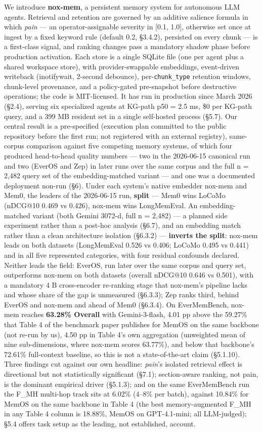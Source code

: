 \documentclass[
]{article}
\begin{document}
We introduce \textbf{nox-mem}, a persistent memory system for autonomous
LLM agents. Retrieval and retention are governed by an additive salience
formula in which \emph{pain} --- an operator-assignable severity in
{[}0.1, 1.0{]}, otherwise set once at ingest by a fixed keyword rule
(default 0.2, §3.4.2), persisted on every chunk --- is a first-class
signal, and ranking changes pass a mandatory shadow phase before
production activation. Each store is a single SQLite file (one per agent
plus a shared workspace store), with provider-swappable embeddings,
event-driven writeback (inotifywait, 2-second debounce),
per-\texttt{chunk\_type} retention windows, chunk-level provenance, and
a policy-gated pre-snapshot before destructive operations; the code is
MIT-licensed. It has run in production since March 2026 (§2.4), serving
six specialized agents at KG-path p50 = 2.5 ms, \$0 per KG-path query,
and a 399 MB resident set in a single self-hosted process (§5.7). Our
central result is a pre-specified (execution plan committed to the
public repository before the first run; not registered with an external
registry), same-corpus comparison against five competing memory systems,
of which four produced head-to-head quality numbers --- two in the
2026-06-15 canonical run and two (EverOS and Zep) in later runs over the
same corpus and the full n = 2,482 query set of the embedding-matched
variant --- and one was a documented deployment non-run (§6). Under each
system's native embedder nox-mem and Mem0, the leaders of the 2026-06-15
run, \textbf{split} --- Mem0 wins LoCoMo (nDCG@10 0.469 vs 0.426),
nox-mem wins LongMemEval. An embedding-matched variant (both Gemini
3072-d, full n = 2,482) --- a planned side experiment rather than a
post-hoc analysis (§6.7), and an embedding match rather than a clean
architecture isolation (§6.3.2) --- \textbf{inverts the split}: nox-mem
leads on both datasets (LongMemEval 0.526 vs 0.406; LoCoMo 0.495 vs
0.441) and in all five represented categories, with four residual
confounds declared. Neither leads the field: EverOS, run later over the
same corpus and query set, outperforms nox-mem on both datasets (overall
nDCG@10 0.646 vs 0.501), with a mandatory 4 B cross-encoder re-ranking
stage that nox-mem's pipeline lacks and whose share of the gap is
unmeasured (§6.3.3); Zep ranks third, behind EverOS and nox-mem and
ahead of Mem0 (§6.3.4). On EverMemBench, nox-mem reaches \textbf{63.28\%
Overall} with Gemini-3-flash, 4.01 pp above the 59.27\% that Table 4 of
the benchmark paper publishes for MemOS on the same backbone (not re-run
by us), 4.50 pp in Table 4's own aggregation (unweighted mean of nine
sub-dimensions, where nox-mem scores 63.77\%), and below that backbone's
72.61\% full-context baseline, so this is not a state-of-the-art claim
(§5.1.10). Three findings cut against our own headline: \emph{pain}'s
isolated retrieval effect is directional but not statistically
significant (§7.1); section-aware ranking, not pain, is the dominant
empirical driver (§5.1.3); and on the same EverMemBench run the F\_MH
multi-hop track sits at 6.02\% (4--8\% per batch), against 10.84\% for
MemOS on the same backbone in Table 4 (the best memory-augmented F\_MH
in any Table 4 column is 18.88\%, MemOS on GPT-4.1-mini; all
LLM-judged); §5.4 offers task setup as the leading, not established,
account.
\end{document}

